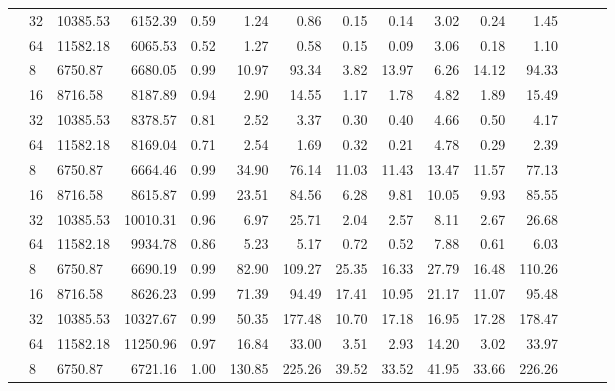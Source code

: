 \begin{table}
{\begin{tabular}{lllrrrrrrrrrrrr}
                            & 32 & 10385.53 & 6152.39   & 0.59   & 1.24   & 0.86   & 0.15  & 0.14  & 3.02  & 0.24  & 1.45    \\
                            & 64 & 11582.18 & 6065.53   & 0.52   & 1.27   & 0.58   & 0.15  & 0.09  & 3.06  & 0.18  & 1.10    \\
                    \addlinespace
                    48      & 8  & 6750.87  & 6680.05   & 0.99   & 10.97  & 93.34  & 3.82  & 13.97 & 6.26  & 14.12 & 94.33   \\
                            & 16 & 8716.58  & 8187.89   & 0.94   & 2.90   & 14.55  & 1.17  & 1.78  & 4.82  & 1.89  & 15.49   \\
                            & 32 & 10385.53 & 8378.57   & 0.81   & 2.52   & 3.37   & 0.30  & 0.40  & 4.66  & 0.50  & 4.17    \\
                            & 64 & 11582.18 & 8169.04   & 0.71   & 2.54   & 1.69   & 0.32  & 0.21  & 4.78  & 0.29  & 2.39    \\
                    \addlinespace
                    96      & 8  & 6750.87  & 6664.46   & 0.99   & 34.90  & 76.14  & 11.03 & 11.43 & 13.47 & 11.57 & 77.13   \\
                            & 16 & 8716.58  & 8615.87   & 0.99   & 23.51  & 84.56  & 6.28  & 9.81  & 10.05 & 9.93  & 85.55   \\
                            & 32 & 10385.53 & 10010.31  & 0.96   & 6.97   & 25.71  & 2.04  & 2.57  & 8.11  & 2.67  & 26.68   \\
                            & 64 & 11582.18 & 9934.78   & 0.86   & 5.23   & 5.17   & 0.72  & 0.52  & 7.88  & 0.61  & 6.03    \\
                    \addlinespace
                    192     & 8  & 6750.87  & 6690.19   & 0.99   & 82.90  & 109.27 & 25.35 & 16.33 & 27.79 & 16.48 & 110.26  \\
                            & 16 & 8716.58  & 8626.23   & 0.99   & 71.39  & 94.49  & 17.41 & 10.95 & 21.17 & 11.07 & 95.48   \\
                            & 32 & 10385.53 & 10327.67  & 0.99   & 50.35  & 177.48 & 10.70 & 17.18 & 16.95 & 17.28 & 178.47  \\
                            & 64 & 11582.18 & 11250.96  & 0.97   & 16.84  & 33.00  & 3.51  & 2.93  & 14.20 & 3.02  & 33.97   \\
                    \addlinespace
                    288     & 8  & 6750.87  & 6721.16   & 1.00   & 130.85 & 225.26 & 39.52 & 33.52 & 41.95 & 33.66 & 226.26  \\

\end{tabular}}
\end{table}
